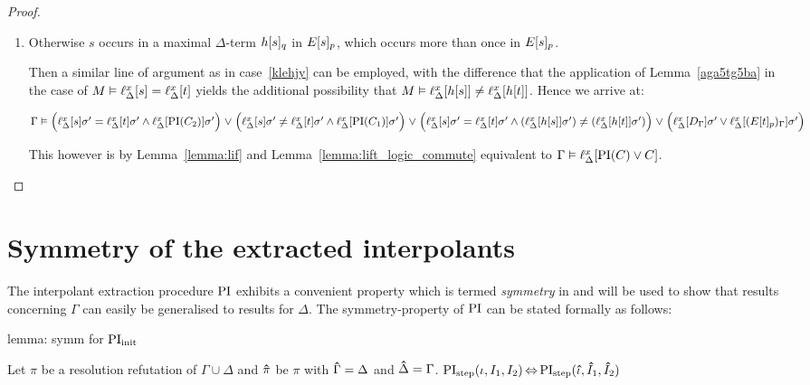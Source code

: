 {\begin{proof}
\begin{description}
\begin{enumerate}
				\item Otherwise $s$ occurs in a maximal $\Delta$-term $h{[s]_{q}}$ in $E{[s]_{p}}$, which occurs more than once in $E{[s]_{p}}$.

					Then a similar line of argument as in case~\ref{klehjy} can be employed, with the difference that the application of Lemma~\ref{aga5tg5ba} in the case of $M\vDash \ell_{\Delta}^{x}[s] = \ell_{\Delta}^{x}[t]$ yields the additional possibility that 
					$M\vDash \ell_{\Delta}^{x}[h[s]] \neq \ell_{\Delta}^{x}[h[t]]$.
					Hence we arrive at:

					$\Gamma \vDash
					\Big(\ell_{\Delta}^{x}[s]\sigma'=\ell_{\Delta}^{x}[t]\sigma' \land \ell_{\Delta}^{x}[\operatorname{PI}(C_2)]\sigma'\Big) \;{\lor}\;\allowbreak
					\Big(\ell_{\Delta}^{x}[s]\sigma'\neq\ell_{\Delta}^{x}[t]\sigma' \land \ell_{\Delta}^{x}[\operatorname{PI}(C_1)]\sigma'\Big) \;{\lor}\;\allowbreak
					\Big(\ell_{\Delta}^{x}[s]\sigma'=\ell_{\Delta}^{x}[t]\sigma' \land (\ell_{\Delta}^{x}[h[s]]\sigma') \neq (\ell_{\Delta}^{x}[h[t]]\sigma' )\Big) \;{\lor}\;\allowbreak
					\Big(\ell_{\Delta}^{x}[D_\Gamma]\sigma' \lor \ell_{\Delta}^{x}[(E{[t]_{p}})_\Gamma]\sigma'\Big)$

					This however is by Lemma~\ref{lemma:lif} and Lemma~\ref{lemma:lift_logic_commute} equivalent to $\Gamma \entails \lifdelta{\PI(C) \lor\nolinebreak C}$.
					\qedhere
			\end{enumerate}
	\end{description}
\end{proof}
}


\section{Symmetry of the extracted interpolants}
\label{sec:symmetry}


The interpolant extraction procedure $\operatorname{PI}$ exhibits a convenient property which is termed \emph{symmetry} in \cite[Definition 5]{interpolantStrenth} and will be used to show that results concerning $\Gamma$ can easily be generalised to results for $\Delta$.
The symmetry-property of $\operatorname{PI}$ can be stated formally as follows:

\newcommand{\primex}[1]{\ensuremath{\bhat{#1}}}
lemma: symm for $\operatorname{PI}_{\mathrm{init}}$

\begin{lemma}
	Let $\pi$ be a resolution refutation of $\Gamma \cup \Delta$ and
	$\primex\pi$ be $\pi$ with $\primex\Gamma = \Delta$ and $\primex\Delta = \Gamma$.
	$\PIstep(\inference, I_1, I_2) \semiff \PIstep(\primex\inference, \primex I_1, \primex I_2)$


\end{lemma}


